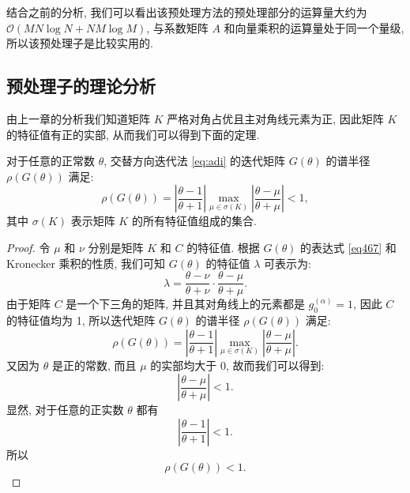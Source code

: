 \documentclass{ecnumaster}
\begin{document}
结合之前的分析,
我们可以看出该预处理方法的预处理部分的运算量大约为
 $\mathcal{O}(MN\log N + NM\log M)$,
与系数矩阵 $A$ 和向量乘积的运算量处于同一个量级,
所以该预处理子是比较实用的.

\subsection{预处理子的理论分析}
由上一章的分析我们知道矩阵 $K$ 严格对角占优且主对角线元素为正,
因此矩阵 $K$ 的特征值有正的实部, 从而我们可以得到下面的定理.

\begin{theorem}\label{th411}
  对于任意的正常数 $\theta$, 交替方向迭代法 \eqref{eq:adi}
  的迭代矩阵 $G(\theta)$ 的谱半径 $\rho (G(\theta))$ 满足:
  $$
    \rho (G(\theta))
    = \left| \frac{\theta -1}{\theta +1} \right|
    \max _{\mu \in \sigma (K)} \left| \frac{\theta - \mu}{\theta + \mu} \right| < 1,
  $$
  其中 $\sigma (K)$ 表示矩阵 $K$ 的所有特征值组成的集合.
\end{theorem}
\begin{proof}
  令 $\mu$ 和 $\nu$ 分别是矩阵 $K$ 和 $C$ 的特征值.
  根据 $G(\theta)$ 的表达式 \eqref{eq467} 和 Kronecker 乘积的性质, 
  我们可知 $G(\theta)$ 的特征值 $\lambda$ 可表示为:
  $$
    \lambda = \frac{\theta - \nu}{\theta + \nu} \cdot \frac{\theta - \mu}{\theta + \mu}.
  $$
  由于矩阵 $C$ 是一个下三角的矩阵,
  并且其对角线上的元素都是 $g_0^{(\alpha)} = 1$,
  因此 $C$ 的特征值均为 1, 所以迭代矩阵 $G(\theta)$ 的谱半径 $\rho (G(\theta))$ 满足:
  $$
    \rho (G(\theta)) = \left| \frac{\theta -1}{\theta + 1} \right|
    \max_{\mu \in \sigma (K)} \left| \frac{\theta - \mu}{\theta + \mu} \right|.
  $$
  又因为 $\theta$ 是正的常数, 而且 $\mu$ 的实部均大于 $0$, 故而我们可以得到:
  $$
    \left| \frac{\theta - \mu}{\theta + \mu}\right| < 1.
  $$
  显然, 对于任意的正实数 $\theta$ 都有
  $$
    \left| \frac{\theta - 1}{\theta + 1} \right| < 1.
  $$
  所以
  $$
    \rho (G(\theta)) < 1.
  $$
\end{proof}
\end{document}
